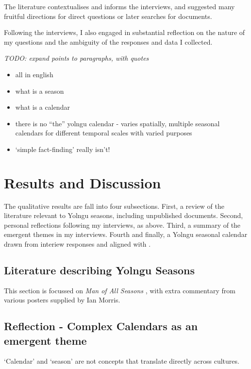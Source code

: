 The literature contextualises and informs the interviews, and suggested many fruitful
directions for direct questions or later searches for documents.


Following the interviews, I also engaged in substantial reflection on the nature of
my questions and the ambiguity of the responses and data I collected.

\emph{TODO: expand points to paragraphs, with quotes}

\begin{itemize}
\item all in english
\item what is a season
\item what is a calendar
\item there is no ``the'' yolngu calendar - varies spatially,
        multiple seasonal calendars for different temporal scales with varied purposes
\item `simple fact-finding' really isn't!
\end{itemize}





\section{Results and Discussion}

The qualitative results are fall into four subsections.
First, a review of the literature relevant to Yolngu seasons, including unpublished documents.
Second, personal reflections following my interviews, as above.
Third, a summary of the emergent themes in my interviews.
Fourth and finally, a Yolngu seasonal calendar drawn from interiew responses and aligned with \citet{davis1989}.


\subsection{Literature describing Yolngu Seasons}
This section is focussed on \textit{Man of All Seasons} \citep{davis1989},
with extra commentary from various posters supplied by Ian Morris.


\subsection{Reflection - Complex Calendars as an emergent theme}

`Calendar' and `season' are not concepts that translate directly across cultures. 

